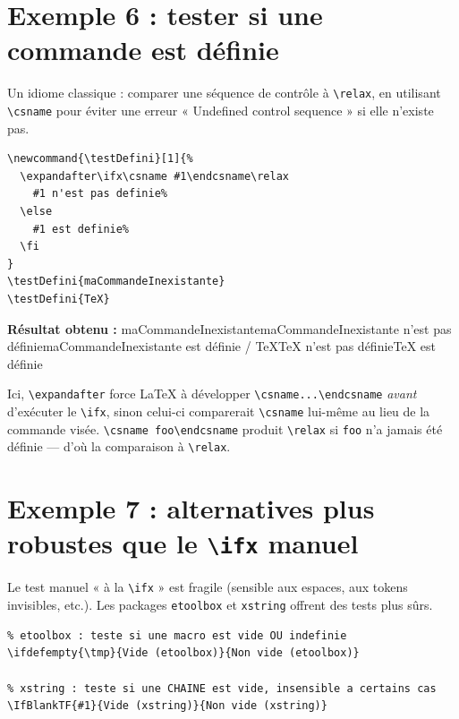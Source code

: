 \documentclass{article}
\newcommand{\Resultat}[1]{{\color{blue!60!black}\textbf{Résultat obtenu :} #1}\par}
\begin{document}
\section{Exemple 6 : tester si une commande est définie}
Un idiome classique : comparer une séquence de contrôle à
\texttt{\textbackslash relax}, en utilisant \texttt{\textbackslash csname}
pour éviter une erreur « Undefined control sequence » si elle n'existe pas.

\begin{verbatim}
\newcommand{\testDefini}[1]{%
  \expandafter\ifx\csname #1\endcsname\relax
    #1 n'est pas definie%
  \else
    #1 est definie%
  \fi
}
\testDefini{maCommandeInexistante}
\testDefini{TeX}
\end{verbatim}

\newcommand{\testDefini}[1]{\expandafter\ifx\csname #1\endcsname\relax #1 n'est pas définie\else #1 est définie\fi}
\Resultat{\testDefini{maCommandeInexistante} \quad / \quad \testDefini{TeX}}

\noindent
Ici, \texttt{\textbackslash expandafter} force \LaTeX{} à développer
\texttt{\textbackslash csname...\textbackslash endcsname} \emph{avant}
d'exécuter le \texttt{\textbackslash ifx}, sinon celui-ci comparerait
\texttt{\textbackslash csname} lui-même au lieu de la commande visée.
\texttt{\textbackslash csname foo\textbackslash endcsname} produit
\texttt{\textbackslash relax} si \texttt{foo} n'a jamais été définie — d'où
la comparaison à \texttt{\textbackslash relax}.

\section{Exemple 7 : alternatives plus robustes que le \texttt{\textbackslash ifx} manuel}
Le test manuel « à la \texttt{\textbackslash ifx} » est fragile (sensible aux
espaces, aux tokens invisibles, etc.). Les packages \texttt{etoolbox} et
\texttt{xstring} offrent des tests plus sûrs.

\begin{verbatim}
% etoolbox : teste si une macro est vide OU indefinie
\ifdefempty{\tmp}{Vide (etoolbox)}{Non vide (etoolbox)}

% xstring : teste si une CHAINE est vide, insensible a certains cas
\IfBlankTF{#1}{Vide (xstring)}{Non vide (xstring)}
\end{verbatim}
\end{document}
